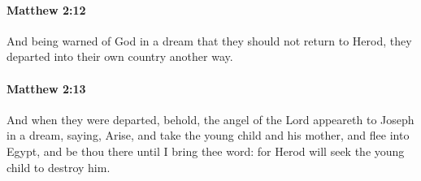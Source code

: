 		\paragraph{Matthew 2:12} %
			\label{MATTHEW-2-12}

			And being warned of God in a dream that they should not return to Herod, they departed into their own country another way.

			\begin{framed}
			\scriptsize
				\begin{compactdesc}
					\item[SBLG] 
				\end{compactdesc}
			\end{framed}

		\paragraph{Matthew 2:13} %
			\label{MATTHEW-2-13}

			And when they were departed, behold, the angel of the Lord appeareth to Joseph in a dream, saying, Arise, and take the young child and his mother, and flee into Egypt, and be thou there until I bring thee word: for Herod will seek the young child to destroy him.

